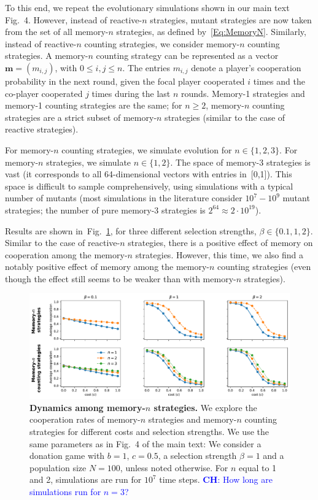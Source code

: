 \documentclass[9pt,twoside,lineno]{pnas-new}
\newcommand{\christian}[1]{\textcolor{blue}{\textbf{CH}: #1}}
\theoremstyle{plainCl1}
\theoremstyle{plainCl2}
\begin{document}
To this end, we repeat the evolutionary simulations shown in our main text Fig.~4. 
However, instead of reactive-$n$ strategies, mutant strategies are now taken from the set of all memory-$n$ strategies, as defined by~\eqref{Eq:MemoryN}. 
Similarly, instead of reactive-$n$ counting strategies, we consider memory-$n$ counting strategies. 
A memory-$n$ counting strategy can be represented as a vector $\mathbf{m} = (m_{i,j})$, with $0 \leq i, j \leq n$. 
The entries $m_{i,j}$ denote a player's cooperation probability in the next round, given the focal player cooperated $i$ times and the co-player cooperated $j$ times during the last $n$ rounds.
Memory-1 strategies and memory-1 counting strategies are the same; for $n\!\ge\!2$, memory-$n$ counting strategies are a strict subset of memory-$n$ strategies (similar to the case of reactive strategies). 

For memory-$n$ counting strategies, we simulate evolution for $n\!\in\!\{1,2,3\}$.
For memory-$n$ strategies, we simulate $n\!\in\!\{1,2\}$. 
The space of memory-3 strategies is vast (it corresponds to all 64-dimensional vectors with entries in~[0,1]). 
This space is difficult to sample comprehensively, using simulations with a typical number of mutants (most simulations in the literature consider $10^7-10^9$ mutant strategies; the number of pure memory-3 strategies is $2^{64}\approx 2\!\cdot\! 10^{19}$). 

Results are shown in~Fig.~\ref{Fig:MemoryN}, for three different selection strengths, $\beta\!\in\!\{0.1,1,2\}$. 
Similar to the case of reactive-$n$ strategies, there is a positive effect of memory on cooperation among the memory-$n$ strategies. 
However, this time, we also find a notably positive effect of memory among the memory-$n$ counting strategies (even though the effect still seems to be weaker than with memory-$n$ strategies). 

\begin{figure}[t]
  \centering
  \includegraphics[width=.9\textwidth]{../../figures/siFigMemorySim.pdf}
  \caption{
  \textbf{Dynamics among memory-$n$ strategies.}
  We explore the cooperation rates of memory-$n$ strategies and memory-$n$ counting strategies for different costs and selection strengths.
  We use the same parameters as in Fig.~4 of the main text: We consider a donation game with \(b\!=\!1\),  \(c\!=\!0.5\), a selection strength $\beta\!=\!1$ and a population size $N\!=\!100$, unless noted otherwise. 
  For $n$ equal to 1 and 2, simulations are run for \(10
  ^ 7\) time steps.\newline
  \christian{How long are simulations run for $n\!=\!3$?}
  }
  \label{Fig:MemoryN}
\end{figure}
\end{document}
